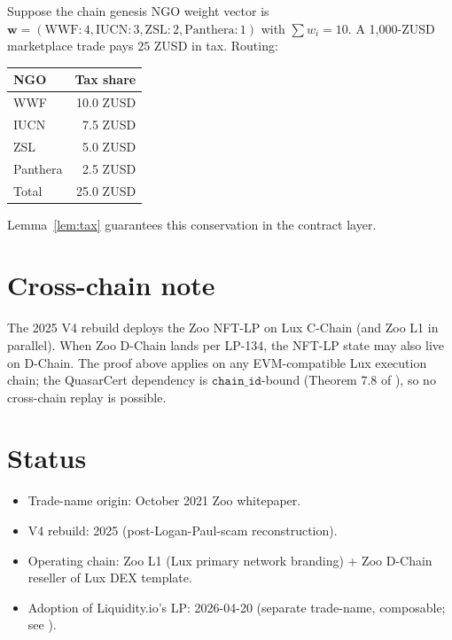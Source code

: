 \documentclass[11pt]{article}
\begin{document}
Suppose the chain genesis NGO weight vector is
$\mathbf{w} = (\mathrm{WWF}: 4, \mathrm{IUCN}: 3, \mathrm{ZSL}: 2,
                \mathrm{Panthera}: 1)$ with $\sum w_i = 10$.
A 1{,}000-ZUSD marketplace trade pays $25$ ZUSD in tax. Routing:

\begin{table}[h]
\centering
\begin{tabular}{lr}
\toprule
NGO & Tax share \\
\midrule
WWF       & 10.0 ZUSD \\
IUCN      &  7.5 ZUSD \\
ZSL       &  5.0 ZUSD \\
Panthera  &  2.5 ZUSD \\
\midrule
Total     & 25.0 ZUSD \\
\bottomrule
\end{tabular}
\end{table}

Lemma~\ref{lem:tax} guarantees this conservation in the contract
layer.

\section{Cross-chain note}
\label{sec:cross}

The 2025 V4 rebuild deploys the Zoo NFT-LP on Lux C-Chain (and Zoo
L1 in parallel). When Zoo D-Chain lands per LP-134, the NFT-LP
state may also live on D-Chain.  The proof above applies on any
EVM-compatible Lux execution chain; the QuasarCert dependency is
$\texttt{chain\_id}$-bound (Theorem 7.8 of \cite{quasar-cert}), so
no cross-chain replay is possible.

\section{Status}
\label{sec:status}

\begin{itemize}[nosep]
  \item Trade-name origin: October 2021 Zoo whitepaper.
  \item V4 rebuild: 2025 (post-Logan-Paul-scam reconstruction).
  \item Operating chain: Zoo L1 (Lux primary network branding) +
        Zoo D-Chain reseller of Lux DEX template.
  \item Adoption of Liquidity.io's LP: 2026-04-20 (separate trade-name,
        composable; see \cite{zoo-adopts}).
\end{itemize}
\end{document}
